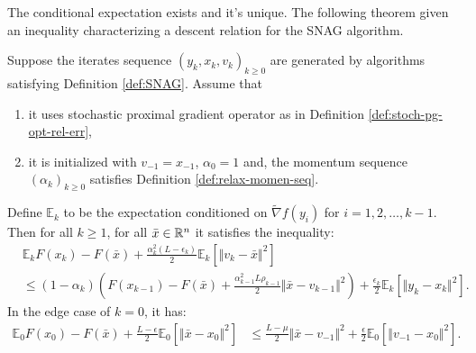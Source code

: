 \documentclass[12pt]{article}
\newcommand{\expect}{\ensuremath{\mathbb E}}
\begin{document}
        \begin{remark}
        \end{remark}
        The conditional expectation exists and it's unique. 
        The following theorem given an inequality characterizing a descent relation for the SNAG algorithm. 
        \begin{theorem}\label{thm:snag-descent}
            Suppose the iterates sequence $(y_k, x_k, v_k)_{k\ge 0}$ are generated by algorithms satisfying Definition \ref{def:SNAG}. 
            Assume that
            \begin{enumerate}[nosep]
                \item it uses stochastic proximal gradient operator as in Definition \ref{def:stoch-pg-opt-rel-err}, 
                \item it is initialized with $v_{-1} = x_{-1}$, $\alpha_0 = 1$ and, the momentum sequence $(\alpha_k)_{k \ge 0}$ satisfies Definition \ref{def:relax-momen-seq}. 
            \end{enumerate}
            Define $\expect_{k}$ to be the expectation conditioned on $\tilde \nabla f(y_i)$ for $i = 1, 2, \ldots, k - 1$. 
            Then for all $k \ge 1$, for all $\bar x \in \mathbb R^n$ it satisfies the inequality: 
            \begin{align*}
                & \expect_kF(x_k) - F(\bar x) 
                + \frac{\alpha_k^2(L - \epsilon_k)}{2}\expect_k \left[\Vert v_k - \bar x\Vert^2\right]
                \\
                &\le 
                (1 - \alpha_k)\left(
                    F(x_{k - 1}) - F(\bar x)
                    + \frac{\alpha_{k - 1}^2L\rho_{k - 1}}{2}\Vert \bar x - v_{k - 1}\Vert^2
                \right) 
                + \frac{\epsilon_k}{2}\expect_k \left[\Vert y_k - x_k \Vert^2\right].  
            \end{align*}
            In the edge case of $k = 0$, it has: 
            \begin{align*}
                \expect_0 F(x_0) - F(\bar x)  
                + \frac{L - \epsilon}{2}\expect_0\left[\Vert \bar x - x_0\Vert^2\right]
                &\le 
                \frac{L - \mu}{2} \Vert \bar x - v_{-1}\Vert^2
                + \frac{\epsilon}{2}\expect_0\left[\Vert v_{-1} - x_0\Vert^2\right]. 
            \end{align*}
        \end{theorem}
\end{document}
